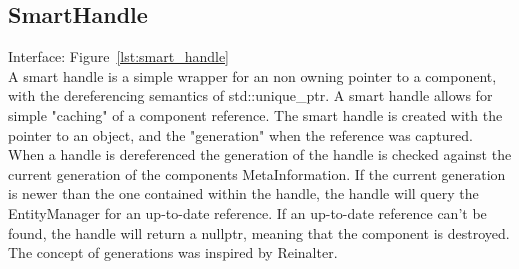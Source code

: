 \subsection{SmartHandle}
Interface: Figure~\ref{lst:smart_handle}\\\noindent
A smart handle is a simple wrapper for an non owning pointer to a component, with the dereferencing semantics of std::unique\_ptr. 
A smart handle allows for simple "caching" of a component reference.
The smart handle is created with the pointer to an object, 
and the "generation" when the reference was captured. 
When a handle is dereferenced the generation of the handle is checked against the current generation of the components MetaInformation. 
If the current generation is newer than the one contained within the handle, 
the handle will query the EntityManager for an up-to-date reference.
If an up-to-date reference can't be found, 
the handle will return a nullptr, meaning that the component is destroyed.
The concept of generations was inspired by Reinalter\cite{molecular_musings_internal_references}.
